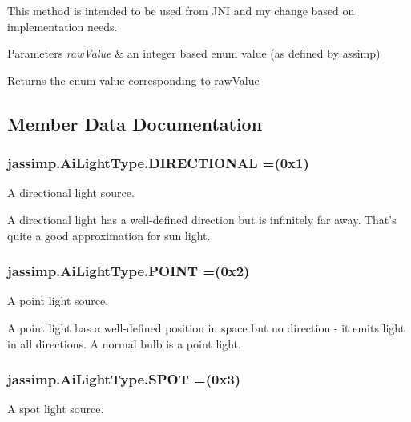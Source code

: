 This method is intended to be used from J\+N\+I and my change based on implementation needs.


\begin{DoxyParams}{Parameters}
{\em raw\+Value} & an integer based enum value (as defined by assimp) \\
\hline
\end{DoxyParams}
\begin{DoxyReturn}{Returns}
the enum value corresponding to raw\+Value 
\end{DoxyReturn}


\subsection{Member Data Documentation}
\hypertarget{enumjassimp_1_1_ai_light_type_a69555b5575675f8a8d37c0d28f743fce}{
\subsubsection[{D\+I\+R\+E\+C\+T\+I\+O\+N\+A\+L}]{\setlength{\rightskip}{0pt plus 5cm}jassimp.\+Ai\+Light\+Type.\+D\+I\+R\+E\+C\+T\+I\+O\+N\+A\+L =(0x1)}}\label{enumjassimp_1_1_ai_light_type_a69555b5575675f8a8d37c0d28f743fce}
A directional light source.

A directional light has a well-\/defined direction but is infinitely far away. That's quite a good approximation for sun light. \hypertarget{enumjassimp_1_1_ai_light_type_a39d633ab4093eaed282c3bf94eea9077}{
\subsubsection[{P\+O\+I\+N\+T}]{\setlength{\rightskip}{0pt plus 5cm}jassimp.\+Ai\+Light\+Type.\+P\+O\+I\+N\+T =(0x2)}}\label{enumjassimp_1_1_ai_light_type_a39d633ab4093eaed282c3bf94eea9077}
A point light source.

A point light has a well-\/defined position in space but no direction -\/ it emits light in all directions. A normal bulb is a point light. \hypertarget{enumjassimp_1_1_ai_light_type_ae5588034705d00b287cd14a8f581c4d4}{
\subsubsection[{S\+P\+O\+T}]{\setlength{\rightskip}{0pt plus 5cm}jassimp.\+Ai\+Light\+Type.\+S\+P\+O\+T =(0x3)}}\label{enumjassimp_1_1_ai_light_type_ae5588034705d00b287cd14a8f581c4d4}
A spot light source.


